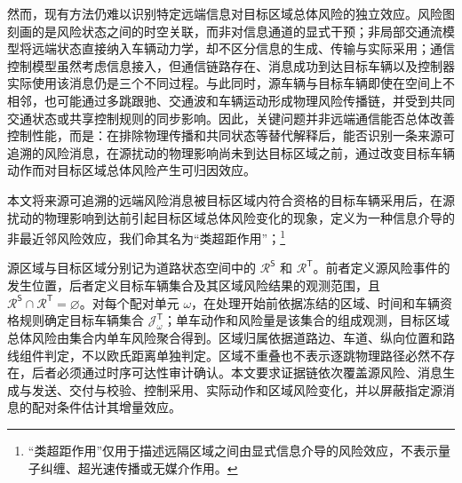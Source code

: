 \documentclass[10pt,a4paper,twocolumn]{article}
\newcommand{\revGreen}[1]{#1}
\newcommand{\revYellow}[1]{#1}
\begin{document}
\revYellow{然而，现有方法仍难以识别特定远端信息对目标区域总体风险的独立效应。风险图刻画的是风险状态之间的时空关联，而非对信息通道的显式干预；非局部交通流模型将远端状态直接纳入车辆动力学，却不区分信息的生成、传输与实际采用；通信控制模型虽然考虑信息接入，但通信链路存在、消息成功到达目标车辆以及控制器实际使用该消息仍是三个不同过程。与此同时，源车辆与目标车辆即使在空间上不相邻，也可能通过多跳跟驰、交通波和车辆运动形成物理风险传播链，并受到共同交通状态或共享控制规则的同步影响。因此，关键问题并非远端通信能否总体改善控制性能，而是：在排除物理传播和共同状态等替代解释后，能否识别一条来源可追溯的风险消息，在源扰动的物理影响尚未到达目标区域之前，通过改变目标车辆动作而对目标区域总体风险产生可归因效应。}

\revGreen{本文将来源可追溯的远端风险消息被目标区域内符合资格的目标车辆采用后，在源扰动的物理影响到达前引起目标区域总体风险变化的现象，定义为一种信息介导的非最近邻风险效应，我们命其名为“类超距作用”；}\footnote{\revGreen{“类超距作用”仅用于描述远隔区域之间由显式信息介导的风险效应，不表示量子纠缠、超光速传播或无媒介作用。}}

\revGreen{源区域与目标区域分别记为道路状态空间中的 $\mathcal R^{\mathsf S}$ 和 $\mathcal R^{\mathsf T}$。前者定义源风险事件的发生位置，后者定义目标车辆集合及其区域风险结果的观测范围，且 $\mathcal R^{\mathsf S}\cap\mathcal R^{\mathsf T}=\varnothing$。对每个配对单元 $\omega$，在处理开始前依据冻结的区域、时间和车辆资格规则确定目标车辆集合 $\mathcal J^{\mathsf T}_{\omega}$；单车动作和风险量是该集合的组成观测，目标区域总体风险由集合内单车风险聚合得到。区域归属依据道路边、车道、纵向位置和路线组件判定，不以欧氏距离单独判定。区域不重叠也不表示逐跳物理路径必然不存在，后者必须通过时序可达性审计确认。本文要求证据链依次覆盖源风险、消息生成与发送、交付与校验、控制采用、实际动作和区域风险变化，并以屏蔽指定源消息的配对条件估计其增量效应。}
\end{document}
